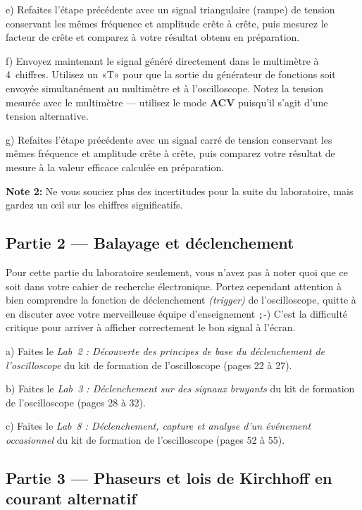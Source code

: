 \documentclass[canadien,12pt,oneside,letterpaper]{article}
\begin{document}
e) Refaites l'étape précédente avec un signal triangulaire (rampe) de tension conservant les mêmes fréquence et amplitude crête à crête, puis mesurez le facteur de crête et comparez à votre résultat obtenu en préparation.

f) Envoyez maintenant le signal généré directement dans le multimètre à 4\textonehalf~chiffres. Utilisez un «T» pour que la sortie du générateur de fonctions soit envoyée simultanément au multimètre et à l'oscilloscope. Notez la tension mesurée avec le multimètre --- utilisez le mode \textbf{ACV} puisqu'il s'agit d'une tension alternative.

g) Refaites l'étape précédente avec un signal carré de tension conservant les mêmes fréquence et amplitude crête à crête, puis comparez votre résultat de mesure à la valeur efficace calculée en préparation.

\textbf{Note 2:} Ne vous souciez plus des incertitudes pour la suite du laboratoire, mais gardez un {\oe}il sur les chiffres significatifs.


\subsection{Partie 2 --- Balayage et déclenchement}

Pour cette partie du laboratoire seulement, vous n'avez pas à noter quoi que ce soit dans votre cahier de recherche électronique. Portez cependant attention à bien comprendre la fonction de déclenchement \textit{(trigger)} de l'oscilloscope, quitte à en discuter avec votre merveilleuse équipe d'enseignement {\texttt ;-)} C'est la difficulté critique pour arriver à afficher correctement le bon signal à l'écran.

a) Faites le \textit{Lab~2 : Découverte des principes de base du déclenchement de l'oscilloscope} du kit de formation de l'oscilloscope (pages 22 à 27).

b) Faites le \textit{Lab~3 : Déclenchement sur des signaux bruyants} du kit de formation de l'oscilloscope (pages 28 à 32).

c) Faites le \textit{Lab~8 : Déclenchement, capture et analyse d'un événement occasionnel} du kit de formation de l'oscilloscope (pages 52 à 55).


\subsection{Partie 3 --- Phaseurs et lois de Kirchhoff en courant alternatif}
\end{document}
